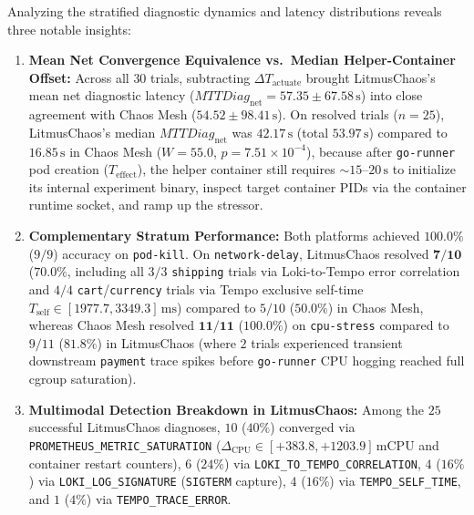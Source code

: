 Analyzing the stratified diagnostic dynamics and latency distributions reveals three notable insights:
\begin{enumerate}
    \item \textbf{Mean Net Convergence Equivalence vs.\ Median Helper-Container Offset:} Across all $30$ trials, subtracting $\Delta T_{\text{actuate}}$ brought LitmusChaos's mean net diagnostic latency ($MTTDiag_{\text{net}} = 57.35 \pm 67.58\,\text{s}$) into close agreement with Chaos Mesh ($54.52 \pm 98.41\,\text{s}$). On resolved trials ($n=25$), LitmusChaos's median $MTTDiag_{\text{net}}$ was $42.17\,\text{s}$ (total $53.97\,\text{s}$) compared to $16.85\,\text{s}$ in Chaos Mesh ($W = 55.0$, $p = 7.51 \times 10^{-4}$), because after \texttt{go-runner} pod creation ($T_{\text{effect}}$), the helper container still requires $\sim 15\text{--}20\,\text{s}$ to initialize its internal experiment binary, inspect target container PIDs via the container runtime socket, and ramp up the stressor.
    \item \textbf{Complementary Stratum Performance:} Both platforms achieved $\mathbf{100.0\%}$ ($9/9$) accuracy on \texttt{pod-kill}. On \texttt{network-delay}, LitmusChaos resolved $\mathbf{7/10}$ ($70.0\%$, including all $3/3$ \texttt{shipping} trials via Loki-to-Tempo error correlation and $4/4$ \texttt{cart}/\texttt{currency} trials via Tempo exclusive self-time $T_{\text{self}} \in [1977.7, 3349.3]\,\text{ms}$) compared to $5/10$ ($50.0\%$) in Chaos Mesh, whereas Chaos Mesh resolved $\mathbf{11/11}$ ($100.0\%$) on \texttt{cpu-stress} compared to $9/11$ ($81.8\%$) in LitmusChaos (where $2$ trials experienced transient downstream \texttt{payment} trace spikes before \texttt{go-runner} CPU hogging reached full cgroup saturation).
    \item \textbf{Multimodal Detection Breakdown in LitmusChaos:} Among the $25$ successful LitmusChaos diagnoses, $10$ ($40\%$) converged via \texttt{PROMETHEUS\_\allowbreak METRIC\_\allowbreak SATURATION} ($\Delta_{\text{CPU}} \in [+383.8,\allowbreak +1203.9]\,\text{mCPU}$ and container restart counters), $6$ ($24\%$) via \texttt{LOKI\_\allowbreak TO\_\allowbreak TEMPO\_\allowbreak CORRELATION}, $4$ ($16\%$) via \texttt{LOKI\_\allowbreak LOG\_\allowbreak SIGNATURE} (\texttt{SIGTERM} capture), $4$ ($16\%$) via \texttt{TEMPO\_\allowbreak SELF\_\allowbreak TIME}, and $1$ ($4\%$) via \texttt{TEMPO\_\allowbreak TRACE\_\allowbreak ERROR}.
\end{enumerate}

